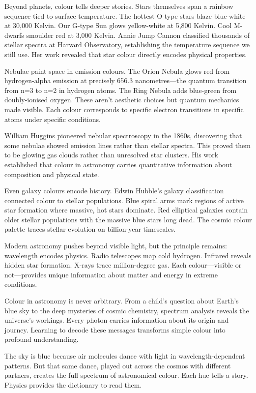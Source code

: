 Beyond planets, colour tells deeper stories. Stars themselves span a rainbow sequence tied to surface temperature. The hottest O-type stars blaze blue-white at 30,000 Kelvin. Our G-type Sun glows yellow-white at 5,800 Kelvin. Cool M-dwarfs smoulder red at 3,000 Kelvin. Annie Jump Cannon classified thousands of stellar spectra at Harvard Observatory, establishing the temperature sequence we still use. Her work revealed that star colour directly encodes physical properties.

Nebulae paint space in emission colours. The Orion Nebula glows red from hydrogen-alpha emission at precisely 656.3 nanometres—the quantum transition from n=3 to n=2 in hydrogen atoms. The Ring Nebula adds blue-green from doubly-ionised oxygen. These aren't aesthetic choices but quantum mechanics made visible. Each colour corresponds to specific electron transitions in specific atoms under specific conditions.

William Huggins pioneered nebular spectroscopy in the 1860s, discovering that some \QSOpen{}nebulae\QSClose{} showed emission lines rather than stellar spectra. This proved them to be glowing gas clouds rather than unresolved star clusters. His work established that colour in astronomy carries quantitative information about composition and physical state.

Even galaxy colours encode history. Edwin Hubble's galaxy classification connected colour to stellar populations. Blue spiral arms mark regions of active star formation where massive, hot stars dominate. Red elliptical galaxies contain older stellar populations with the massive blue stars long dead. The cosmic colour palette traces stellar evolution on billion-year timescales.

Modern astronomy pushes beyond visible light, but the principle remains: wavelength encodes physics. Radio telescopes map cold hydrogen. Infrared reveals hidden star formation. X-rays trace million-degree gas. Each \QSOpen{}colour\QSClose{}—visible or not—provides unique information about matter and energy in extreme conditions.

Colour in astronomy is never arbitrary. From a child's question about Earth's blue sky to the deep mysteries of cosmic chemistry, spectrum analysis reveals the universe's workings. Every photon carries information about its origin and journey. Learning to decode these messages transforms simple colour into profound understanding.

The sky is blue because air molecules dance with light in wavelength-dependent patterns. But that same dance, played out across the cosmos with different partners, creates the full spectrum of astronomical colour. Each hue tells a story. Physics provides the dictionary to read them.
